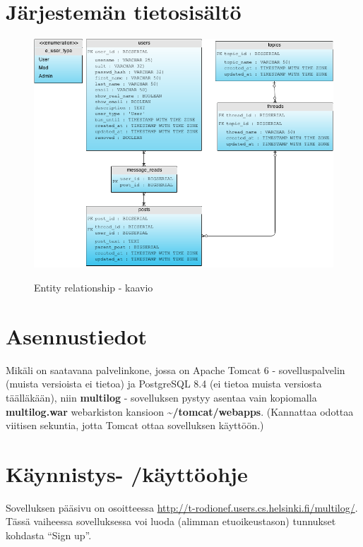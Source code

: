 \documentclass[10pt]{article}
\begin{document}
\section{Järjestemän tietosisältö}
\begin{figure}[H]
  \caption{Entity relationship - kaavio}
  \centering
  \includegraphics[width=\textwidth, keepaspectratio]{ERDiagram}
  \label{fig:erdiagram}
\end{figure}

\section{Asennustiedot}
Mikäli on saatavana palvelinkone, jossa on Apache Tomcat 6 - sovelluspalvelin (muista versioista ei tietoa) ja PostgreSQL 8.4 (ei tietoa muista versiosta täälläkään), niin \textbf{multilog} - sovelluksen pystyy asentaa vain kopiomalla \textbf{multilog.war} webarkiston kansioon \textbf{\textasciitilde/tomcat/webapps}. (Kannattaa odottaa viitisen sekuntia, jotta Tomcat ottaa sovelluksen käyttöön.)

\section{Käynnistys- /käyttöohje}
Sovelluksen pääsivu on osoitteessa \url{http://t-rodionef.users.cs.helsinki.fi/multilog/}.
Tässä vaiheessa sovelluksessa voi luoda (alimman etuoikeustason) tunnukset kohdasta ``Sign up''.
\end{document}
